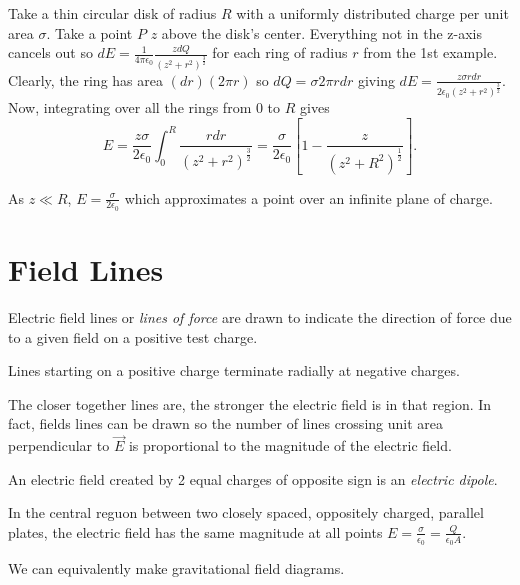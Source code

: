 \begin{example}
    Take a thin circular disk of radius $R$ with a uniformly distributed charge per unit area $\sigma$. Take a point $P$ $z$ above the disk's center. Everything not in the z-axis cancels out so $dE = \frac{1}{4\pi\epsilon_0}\frac{zdQ}{(z^2+r^2)^{\frac{3}{2}}}$ for each ring of radius $r$ from the 1st example. Clearly, the ring has area $(dr)(2\pi r)$ so $dQ = \sigma 2\pi r dr$ giving $dE = \frac{z\sigma r dr}{2\epsilon_0(z^2+r^2)^{\frac{3}{2}}}$. Now, integrating over all the rings from $0$ to $R$ gives $$E = \frac{z\sigma}{2\epsilon_0} \int_0^R \frac{rdr}{(z^2+r^2)^{\frac{3}{2}}} = \frac{\sigma}{2\epsilon_0}\left[1 - \frac{z}{(z^2+R^2)^\frac{1}{2}}\right].$$

    As $z \ll R$, $E = \frac{\sigma}{2\epsilon_0}$ which approximates a point over an infinite plane of charge.
\end{example}

\section{Field Lines}

\begin{definition}
    Electric field lines or \emph{lines of force} are drawn to indicate the direction of force due to a given field on a positive test charge.

    Lines starting on a positive charge terminate radially at negative charges.
\end{definition}
\begin{remark}
    The closer together lines are, the stronger the electric field is in that region. In fact, fields lines can be drawn so the number of lines crossing unit area perpendicular to $\vec{E}$ is proportional to the magnitude of the electric field.
\end{remark}
\begin{definition}
    An electric field created by 2 equal charges of opposite sign is an \emph{electric dipole}.
\end{definition}
\begin{remark}
    In the central reguon between two closely spaced, oppositely charged, parallel plates, the electric field has the same magnitude at all points $E = \frac{\sigma}{\epsilon_0} = \frac{Q}{\epsilon_0A}$.
\end{remark}
\begin{note}
    We can equivalently make gravitational field diagrams.
\end{note}

